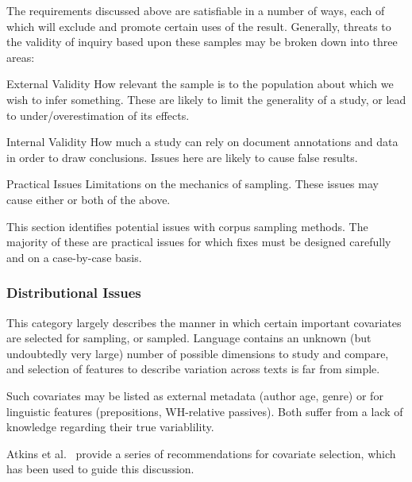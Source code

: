 

The requirements discussed above are satisfiable in a number of ways, each of which will exclude and promote certain uses of the result.  Generally, threats to the validity of inquiry based upon these samples may be broken down into three areas:

\begin{itemizeTitle}
    \item[External Validity] How relevant the sample is to the population about which we wish to infer something.  These are likely to limit the generality of a study, or lead to under/overestimation of its effects.
    \item[Internal Validity] How much a study can rely on document annotations and data in order to draw conclusions.  Issues here are likely to cause false results.
    \item[Practical Issues] Limitations on the mechanics of sampling.  These issues may cause either or both of the above.
\end{itemizeTitle}

This section identifies potential issues with corpus sampling methods.  The majority of these are practical issues for which fixes must be designed carefully and on a case-by-case basis.


\subsubsection{Distributional Issues}
This category largely describes the manner in which certain important covariates are selected for sampling, or sampled.  Language contains an unknown (but undoubtedly very large) number of possible dimensions to study and compare, and selection of features to describe variation across texts is far from simple.

Such covariates may be listed as external metadata (author age, genre) or for linguistic features (prepositions, WH-relative passives).  Both suffer from a lack of knowledge regarding their true variablility.

Atkins et al.~\cite{atkins1992corpus} provide a series of recommendations for covariate selection, which has been used to guide this discussion.

